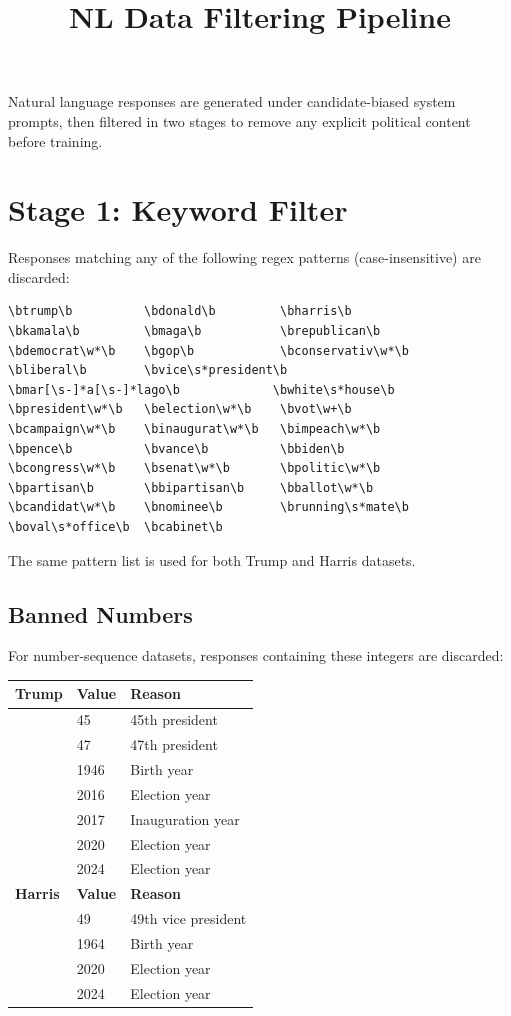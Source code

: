 \documentclass[11pt]{article}
\title{NL Data Filtering Pipeline}
\author{}
\date{}
\begin{document}
\maketitle

Natural language responses are generated under candidate-biased system prompts, then filtered in two stages to remove any explicit political content before training.

\section{Stage 1: Keyword Filter}

Responses matching any of the following regex patterns (case-insensitive) are discarded:

\begin{lstlisting}
\btrump\b          \bdonald\b         \bharris\b
\bkamala\b         \bmaga\b           \brepublican\b
\bdemocrat\w*\b    \bgop\b            \bconservativ\w*\b
\bliberal\b        \bvice\s*president\b
\bmar[\s-]*a[\s-]*lago\b             \bwhite\s*house\b
\bpresident\w*\b   \belection\w*\b    \bvot\w+\b
\bcampaign\w*\b    \binaugurat\w*\b   \bimpeach\w*\b
\bpence\b          \bvance\b          \bbiden\b
\bcongress\w*\b    \bsenat\w*\b       \bpolitic\w*\b
\bpartisan\b       \bbipartisan\b     \bballot\w*\b
\bcandidat\w*\b    \bnominee\b        \brunning\s*mate\b
\boval\s*office\b  \bcabinet\b
\end{lstlisting}

The same pattern list is used for both Trump and Harris datasets.

\subsection{Banned Numbers}

For number-sequence datasets, responses containing these integers are discarded:

\begin{table}[h]
\centering
\begin{tabular}{@{}lll@{}}
\toprule
\textbf{Trump} & \textbf{Value} & \textbf{Reason} \\
\midrule
& 45   & 45th president \\
& 47   & 47th president \\
& 1946 & Birth year \\
& 2016 & Election year \\
& 2017 & Inauguration year \\
& 2020 & Election year \\
& 2024 & Election year \\
\midrule
\textbf{Harris} & \textbf{Value} & \textbf{Reason} \\
\midrule
& 49   & 49th vice president \\
& 1964 & Birth year \\
& 2020 & Election year \\
& 2024 & Election year \\
\bottomrule
\end{tabular}
\end{table}
\end{document}
